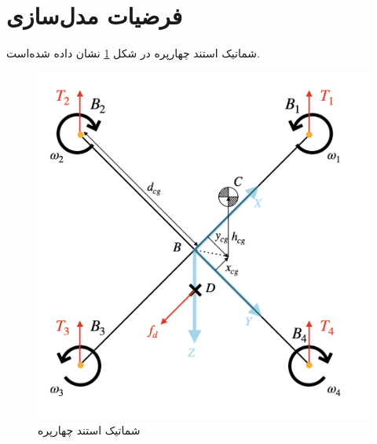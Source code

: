 \section{فرضیات مدل‌سازی}\label{sec_modelassum}
شماتیک استند چهارپره در شكل \ref{QuadAssum} نشان داده شده‌است.
\begin{figure}[H]
	\includegraphics[width=12cm]{../Figures/Forces/StandAssumations.png}
	\centering
	\caption{شماتیک استند چهارپره}
	\label{QuadAssum}
\end{figure}